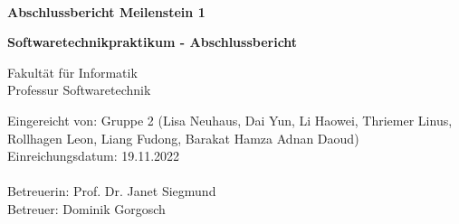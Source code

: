 \documentclass[a4paper, 12pt, oneside, BCOR1cm,toc=chapterentrywithdots]{scrbook}
\begin{document}
%
%

\begin{titlepage}

{
    \begin{center}
        \\
    \end{center}
    \vspace{0.5cm}
}

\begin{center}

\LARGE{\textbf{Abschlussbericht Meilenstein 1}}\\
\vspace{1cm}


\Large{\textbf{Softwaretechnikpraktikum - Abschlussbericht}}\\ 
\vspace{1cm}

Fakultät für Informatik\\
Professur Softwaretechnik
\end{center}
\vspace{3cm}
Eingereicht von: Gruppe 2 (Lisa Neuhaus, Dai Yun, Li Haowei, Thriemer Linus, Rollhagen Leon, Liang Fudong, Barakat Hamza Adnan Daoud)\\
Einreichungsdatum: 19.11.2022\\
\vspace{0.3cm}\\
Betreuerin: Prof. Dr. Janet Siegmund \\
Betreuer: Dominik Gorgosch

\end{titlepage}
\end{document}
